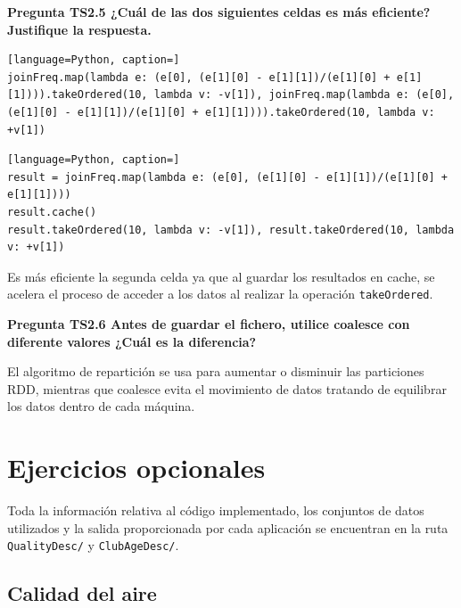 \documentclass[10pt,swedish, openany]{book}
\begin{document}
\vspace{0.8em}

\textbf{Pregunta TS2.5 ¿Cuál de las dos siguientes celdas es más eficiente? Justifique la respuesta.}

\begin{lstlisting}[language=Python, caption=]
joinFreq.map(lambda e: (e[0], (e[1][0] - e[1][1])/(e[1][0] + e[1][1]))).takeOrdered(10, lambda v: -v[1]), joinFreq.map(lambda e: (e[0], (e[1][0] - e[1][1])/(e[1][0] + e[1][1]))).takeOrdered(10, lambda v: +v[1])
\end{lstlisting}

\begin{lstlisting}[language=Python, caption=]
result = joinFreq.map(lambda e: (e[0], (e[1][0] - e[1][1])/(e[1][0] + e[1][1])))
result.cache()
result.takeOrdered(10, lambda v: -v[1]), result.takeOrdered(10, lambda v: +v[1])
\end{lstlisting}


Es más eficiente la segunda celda ya que al guardar los resultados en cache, se acelera el proceso de acceder a los datos al realizar la operación \texttt{takeOrdered}.
\vspace{0.8em}

\textbf{Pregunta TS2.6 Antes de guardar el fichero, utilice coalesce con diferente valores ¿Cuál es la diferencia?}

El algoritmo de repartición se usa para aumentar o disminuir las particiones RDD, mientras que coalesce evita el movimiento de datos tratando de equilibrar los datos dentro de cada máquina.


\chapter{Ejercicios opcionales}

Toda la información relativa al código implementado, los conjuntos de datos utilizados y la salida proporcionada por cada aplicación se encuentran en la ruta \texttt{QualityDesc/} y \texttt{ClubAgeDesc/}.


\section{Calidad del aire}
\end{document}
